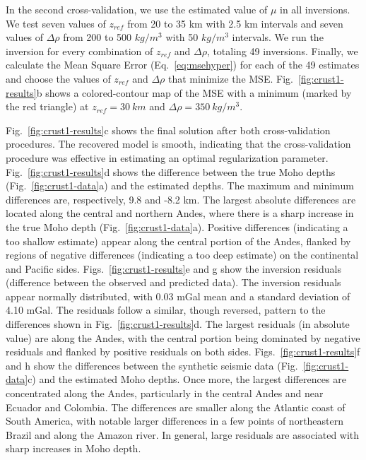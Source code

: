 \documentclass[extra,mreferee]{gji}
\begin{document}
In the second cross-validation,
we use the estimated value of $\mu$ in all inversions.
We test seven values of $z_{ref}$ from 20 to 35 km with 2.5 km intervals
and seven values of $\Delta\rho$ from 200 to 500 $kg/m^3$
with 50 $kg/m^3$ intervals.
We run the inversion for every combination of $z_{ref}$ and $\Delta\rho$,
totaling 49 inversions.
Finally, we calculate the Mean Square Error (Eq.~\ref{eq:msehyper})
for each of the 49 estimates
and choose the values of $z_{ref}$ and $\Delta\rho$ that minimize the MSE.
Fig.~\ref{fig:crust1-results}b
shows a colored-contour map of the MSE
with a minimum (marked by the red triangle)
at $z_{ref} = 30\ km$ and $\Delta\rho = 350\ kg/m^3$.

Fig.~\ref{fig:crust1-results}c shows the final solution after both
cross-validation procedures.
The recovered model is smooth, indicating that the cross-validation procedure
was effective in estimating an optimal regularization parameter.
Fig.~\ref{fig:crust1-results}d shows the difference between
the true Moho depths (Fig.~\ref{fig:crust1-data}a)
and the estimated depths.
The maximum and minimum differences are, respectively,
9.8 and -8.2 km.
The largest absolute differences are located along the central and northern
Andes, where there is a sharp increase in the true Moho depth
(Fig.~\ref{fig:crust1-data}a).
Positive differences (indicating a too shallow estimate)
appear along the central portion of the Andes,
flanked by regions of negative differences (indicating a too deep estimate)
on the continental and Pacific sides.
Figs.~\ref{fig:crust1-results}e and g show the inversion residuals (difference
between the observed and predicted data).
The inversion residuals appear normally distributed,
with 0.03 mGal mean and a standard deviation of 4.10 mGal.
The residuals follow a similar, though reversed, pattern
to the differences shown in Fig.~\ref{fig:crust1-results}d.
The largest residuals (in absolute value) are along the Andes,
with the central portion being dominated by negative residuals
and flanked by positive residuals on both sides.
Figs.~\ref{fig:crust1-results}f and h show the differences between
the synthetic seismic data (Fig.~\ref{fig:crust1-data}c)
and the estimated Moho depths.
Once more, the largest differences are concentrated along the Andes,
particularly in the central Andes and near Ecuador and Colombia.
The differences are smaller along the Atlantic coast of South America,
with notable larger differences in a few points of northeastern Brazil
and along the Amazon river.
In general, large residuals are associated with sharp increases in Moho depth.
\end{document}
